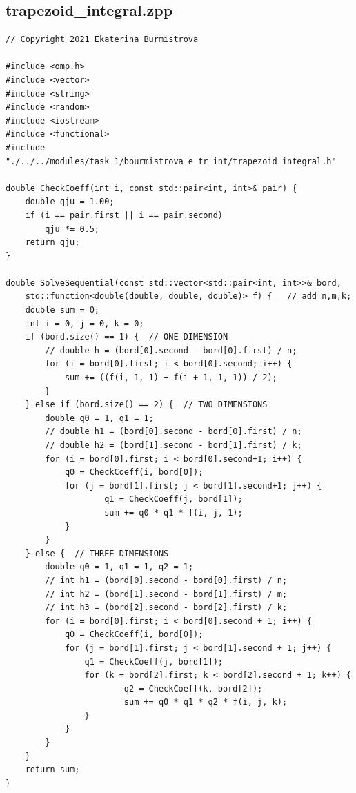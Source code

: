 \documentclass{report}
\begin{document}
 	\subsection*{trapezoid\_integral.zpp}
 	\begin{verbatim}
// Copyright 2021 Ekaterina Burmistrova

#include <omp.h>
#include <vector>
#include <string>
#include <random>
#include <iostream>
#include <functional>
#include "./../../modules/task_1/bourmistrova_e_tr_int/trapezoid_integral.h"

double CheckCoeff(int i, const std::pair<int, int>& pair) {
    double qju = 1.00;
    if (i == pair.first || i == pair.second)
        qju *= 0.5;
    return qju;
}

double SolveSequential(const std::vector<std::pair<int, int>>& bord,
    std::function<double(double, double, double)> f) {   // add n,m,k;
    double sum = 0;
    int i = 0, j = 0, k = 0;
    if (bord.size() == 1) {  // ONE DIMENSION
        // double h = (bord[0].second - bord[0].first) / n;
        for (i = bord[0].first; i < bord[0].second; i++) {
            sum += ((f(i, 1, 1) + f(i + 1, 1, 1)) / 2);
        }
    } else if (bord.size() == 2) {  // TWO DIMENSIONS
        double q0 = 1, q1 = 1;
        // double h1 = (bord[0].second - bord[0].first) / n;
        // double h2 = (bord[1].second - bord[1].first) / k;
        for (i = bord[0].first; i < bord[0].second+1; i++) {
            q0 = CheckCoeff(i, bord[0]);
            for (j = bord[1].first; j < bord[1].second+1; j++) {
                    q1 = CheckCoeff(j, bord[1]);
                    sum += q0 * q1 * f(i, j, 1);
            }
        }
    } else {  // THREE DIMENSIONS
        double q0 = 1, q1 = 1, q2 = 1;
        // int h1 = (bord[0].second - bord[0].first) / n;
        // int h2 = (bord[1].second - bord[1].first) / m;
        // int h3 = (bord[2].second - bord[2].first) / k;
        for (i = bord[0].first; i < bord[0].second + 1; i++) {
            q0 = CheckCoeff(i, bord[0]);
            for (j = bord[1].first; j < bord[1].second + 1; j++) {
                q1 = CheckCoeff(j, bord[1]);
                for (k = bord[2].first; k < bord[2].second + 1; k++) {
                        q2 = CheckCoeff(k, bord[2]);
                        sum += q0 * q1 * q2 * f(i, j, k);
                }
            }
        }
    }
    return sum;
}
 	\end{verbatim}
\end{document}
